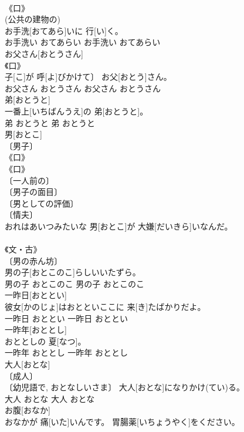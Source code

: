 \documentclass[8pt]{extreport}
\begin{document}
\begin{CJK}{UTF8}{min}
\\	《口》 
\\	(公共の建物の) 
\\	お手洗[おてあら]いに 行[い]く。	
\\	お手洗い	おてあらい	お手洗い	おてあらい	
\\	お父さん[おとうさん]	
\\	《口》 
\\	子[こ]が 呼[よ]びかけて〕 お父[おとう]さん。	
\\	お父さん	おとうさん	お父さん	おとうさん	
\\	弟[おとうと]	
\\	一番上[いちばんうえ]の 弟[おとうと]。	
\\	弟	おとうと	弟	おとうと	
\\	男[おとこ]	
\\	〔男子〕 
\\	《口》 
\\	《口》 
\\	〔一人前の〕 
\\	〔男子の面目〕 
\\	〔男としての評価〕 
\\	〔情夫〕 
\\	おれはあいつみたいな 男[おとこ]が 大嫌[だいきら]いなんだ。	
\\	[《口》 
\\	男	おとこ	男	おとこ	
\\	男の子[おとこのこ]	
\\	《文・古》 
\\	〔男の赤ん坊〕 
\\	男の子[おとこのこ]らしいいたずら。	
\\	男の子	おとこのこ	男の子	おとこのこ	
\\	一昨日[おととい]	
\\	彼女[かのじょ]はおとといここに 来[き]たばかりだよ。	
\\	一昨日	おととい	一昨日	おととい	
\\	一昨年[おととし]	
\\	おととしの 夏[なつ]。	
\\	一昨年	おととし	一昨年	おととし	
\\	大人[おとな]	
\\	〔成人〕 
\\	〔幼児語で, おとなしいさま〕	大人[おとな]になりかけ(てい)る。	
\\	大人	おとな	大人	おとな	
\\	お腹[おなか]	
\\	おなかが 痛[いた]いんです。 胃腸薬[いちょうやく]をください。	

\end{CJK}
\end{document}

